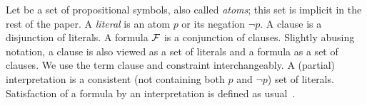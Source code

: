 Let \voc be a set of propositional symbols, also called \emph{atoms}; this set is implicit in the rest of the paper. A \emph{literal} is an atom $p$ or its negation $\lnot p$. 
A clause is a disjunction of literals. A formula $\mathcal{F} $ is a conjunction of clauses. 
Slightly abusing notation, a clause is also viewed as a set of literals and a formula as a set of clauses. We use the term clause and constraint interchangeably.
A (partial) interpretation is a consistent (not containing both $p$ and $\lnot p$) set of literals. 
Satisfaction of a formula \formula by an interpretation is defined as usual~\cite{faia/2009-185}.
